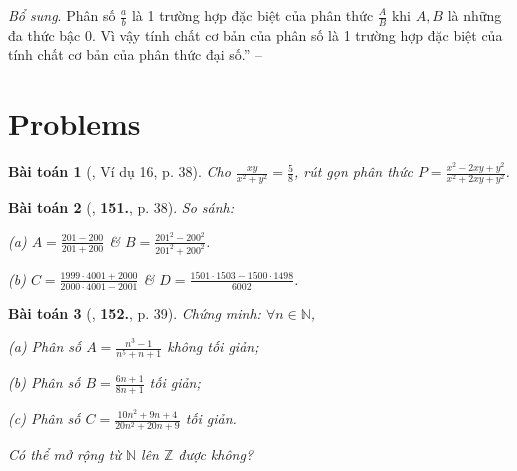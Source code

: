 \documentclass{article}
\numberwithin{equation}{section}
\newtheorem{baitoan}{Bài toán}[section]
\begin{document}
\textit{Bổ sung}. Phân số $\frac{a}{b}$ là 1 trường hợp đặc biệt của phân thức $\frac{A}{B}$ khi $A,B$ là những đa thức bậc 0. Vì vậy tính chất cơ bản của phân số là 1 trường hợp đặc biệt của tính chất cơ bản của phân thức đại số.'' -- \cite[pp. 37--38]{Tuyen_Toan_8}


\section{Problems}

\begin{baitoan}[\cite{Tuyen_Toan_8}, Ví dụ 16, p. 38]
	Cho $\frac{xy}{x^2 + y^2} = \frac{5}{8}$, rút gọn phân thức $P = \frac{x^2 - 2xy + y^2}{x^2 + 2xy + y^2}$.
\end{baitoan}

\begin{baitoan}[\cite{Tuyen_Toan_8}, \textbf{151.}, p. 38]
	So sánh:
	\begin{enumerate*}
		\item[(a)] $A = \frac{201 - 200}{201 + 200}$ \& $B = \frac{201^2 - 200^2}{201^2 + 200^2}$.
		\item[(b)] $C = \frac{1999\cdot 4001 + 2000}{2000\cdot 4001 - 2001}$ \& $D = \frac{1501\cdot 1503 - 1500\cdot 1498}{6002}$.
	\end{enumerate*}
\end{baitoan}

\begin{baitoan}[\cite{Tuyen_Toan_8}, \textbf{152.}, p. 39]
	Chứng minh: $\forall n\in\mathbb{N}$,
	\begin{enumerate*}
		\item[(a)] Phân số $A = \frac{n^3 - 1}{n^5 + n + 1}$ không tối giản;
		\item[(b)] Phân số $B = \frac{6n + 1}{8n + 1}$ tối giản;
		\item[(c)] Phân số $C = \frac{10n^2 + 9n + 4}{20n^2 + 20n + 9}$ tối giản.
	\end{enumerate*}
	Có thể mở rộng từ $\mathbb{N}$ lên $\mathbb{Z}$ được không?
\end{baitoan}


\printbibliography[heading=bibintoc]
	
\end{document}
